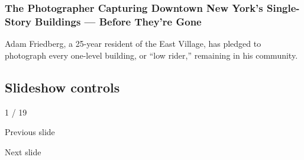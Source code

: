 \hypertarget{the-photographer-capturing-downtown-new-yorks-single-story-buildings--before-theyre-gone-1}{%
\subsubsection{The Photographer Capturing Downtown New York's
Single-Story Buildings --- Before They're
Gone}\label{the-photographer-capturing-downtown-new-yorks-single-story-buildings--before-theyre-gone-1}}

Adam Friedberg, a 25-year resident of the East Village, has pledged to
photograph every one-level building, or ``low rider,'' remaining in his
community.

\hypertarget{slideshow-controls}{%
\subsection{Slideshow controls}\label{slideshow-controls}}

1 / 19

Previous slide

Next slide
